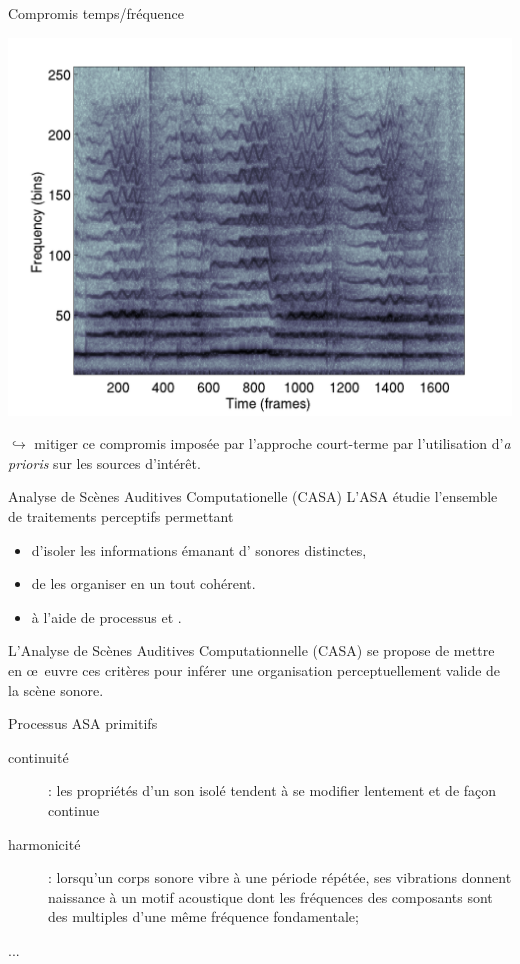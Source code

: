 \begin{frame}{Compromis temps/fréquence}
\begin{center}
\includegraphics[width=.7\columnwidth]{figures/soloSpec} 
\end{center}
	$\hookrightarrow{}$ mitiger ce compromis imposée par l'approche court-terme par l'utilisation d'\alert{\textit{a prioris}} sur les sources d'intérêt.
\end{frame}

\begin{frame}{Analyse de Scènes Auditives Computationelle (CASA)}
L'ASA étudie l'ensemble de traitements perceptifs permettant
\begin{itemize}
\item d'isoler les informations émanant d' sonores distinctes,
\item de les organiser en un tout cohérent.
\item à l'aide de processus  et .
\end{itemize}
L'Analyse de Scènes Auditives Computationnelle (CASA) se propose de mettre en \oe~euvre ces critères pour inférer une organisation perceptuellement valide de la scène sonore.
\end{frame}

\begin{frame}{Processus ASA \og primitifs \fg}
\begin{description}
\item[\alert<2>{continuité}] : les propriétés d'un son isolé tendent à se modifier lentement et de façon continue
\item[harmonicité] : lorsqu'un corps sonore vibre à une période répétée, ses vibrations donnent naissance à un motif acoustique dont les fréquences des composants sont des multiples d'une même fréquence fondamentale;
\item[...]
\end{description}
\end{frame}

